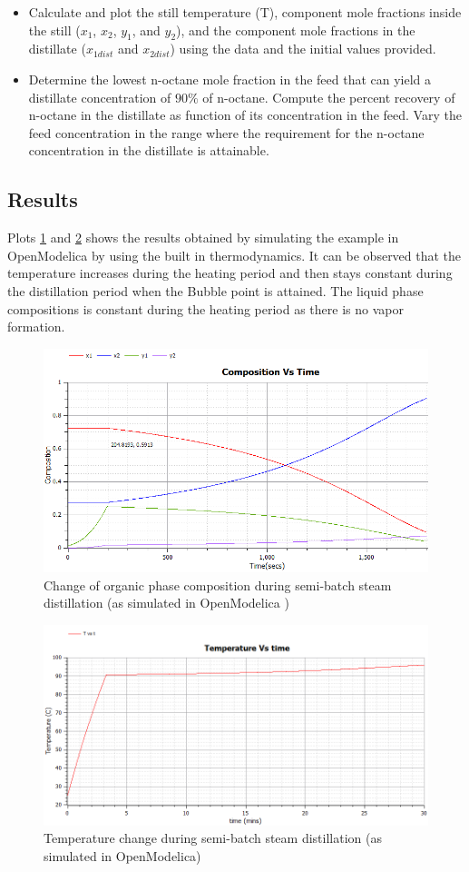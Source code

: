\documentclass[12pt]{report}
\begin{document}
\begin{itemize}
\item Calculate and plot the still temperature (T), component mole fractions inside the still ($x_1$, $x_2$, $y_1$, and $y_2$), and the component mole fractions in the distillate ($x_{1dist}$ and $x_{2dist}$) using the data and the initial values provided.
\item Determine the lowest n-octane mole fraction in the feed that can yield a distillate concentration of $90\%$ of n-octane. Compute the percent recovery of n-octane in the distillate as function of its concentration in the feed. Vary the feed concentration in the range where the requirement for the n-octane concentration in the distillate is attainable.
\end{itemize}

\subsection{Results}
Plots \ref{SD1} and \ref{SD2} shows the results obtained by simulating the example in OpenModelica by using the built in thermodynamics. It can be observed that the temperature increases during the heating period and then stays constant during the distillation period when the Bubble point is attained. The liquid phase compositions is constant during the heating period as there is no vapor formation. \\
\begin{figure}
\centering
\includegraphics[width=0.8\linewidth]{SD1}
\caption{Change of organic phase composition during semi-batch steam distillation (as simulated in OpenModelica )}
\label{SD1}
\end{figure}
\begin{figure}
\centering
\includegraphics[width=0.8\linewidth]{SD2}
\caption{Temperature change during semi-batch steam distillation (as simulated in OpenModelica)}
\label{SD2}
\end{figure}
\end{document}

